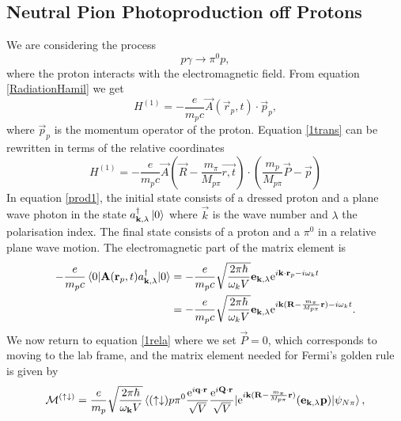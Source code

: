 \subsection{Neutral Pion Photoproduction off Protons}\label{sec:NeutralOffProton}
We are considering the process 
\begin{equation} \label{prod1}
	p\gamma \rightarrow \pi^0 p,
\end{equation}
where the proton interacts with the electromagnetic field. From equation \eqref{RadiationHamil} we get
\begin{equation} \label{1trans}
	H^{(1)} = -\frac{e}{m_pc} \vec{A}(\vec{r}_p,t)\cdot \vec{p}_p,
\end{equation}
where $\vec{p}_p$ is the momentum operator of the proton.  Equation \eqref{1trans} can be rewritten in terms of the relative coordinates
\begin{equation} \label{1rela}
	H^{(1)} = -\frac{e}{m_p c}\vec{A}\left( \vec{R}-\frac{m_\pi}{M_{p\pi}}\vec{r,t}\right) \cdot \left( \frac{m_p}{M_{p\pi}}\vec{P}-\vec{p}\right)
\end{equation}
In equation \eqref{prod1}, the initial state consists of a dressed proton and a plane wave photon in the state $a_{\bm{\mathrm{k}},\lambda}^\dagger\ket{0}$ where $\vec{k}$ is the wave number and $\lambda$ the polarisation index. The final state consists of a proton and a $\pi^0$ in a relative plane wave motion. The electromagnetic part of the matrix element is
\begin{align} \label{eletrans}
	-\frac{e}{m_p c}\mel{0}{\bm{\mathrm{A}}(\bm{\mathrm{r}}_p,t)a^\dagger_{\bm{\mathrm{k}},\lambda}}{0} &= -\frac{e}{m_p c}\sqrt{\frac{2\pi\hbar}{\omega_k V}}\bm{\mathrm{e}}_{\bm{\mathrm{k}},\lambda} \text{e}^{i\bm{\mathrm{k}}\cdot \bm{\mathrm{r}}_p-i\omega_k t} \\
	&=  -\frac{e}{m_p c}\sqrt{\frac{2\pi\hbar}{\omega_k V}}\bm{\mathrm{e}}_{\bm{\mathrm{k}},\lambda} \text{e}^{i\bm{\mathrm{k}}( \bm{\mathrm{R}}-\frac{m_\pi}{M_{p\pi}}\bm{\mathrm{r}})-i\omega_k t}.
\end{align}
We now return to equation \ref{1rela} where we set $\vec{P}=0$, which corresponds to moving to the lab frame, and the matrix element needed for Fermi's golden rule is given by
\begin{equation}\label{MatrixSpinupdown} 
	\mathcal{M}^{(\uparrow\downarrow)} = \frac{e}{m_p} \sqrt{\frac{2\pi\hbar}{\omega_{\bm{\mathrm{k}}}V}} \mel*{(\uparrow\downarrow)p\pi^0 \frac{\text{e}^{i\bm{\mathrm{q}}\cdot \bm{\mathrm{r}}}}{\sqrt{V}}\frac{\text{e}^{i\bm{\mathrm{Q}}\cdot \bm{\mathrm{r}}}}{\sqrt{V}}}{\text{e}^{i\bm{\mathrm{k}}(\bm{\mathrm{R}}-\frac{m_\pi}{M_{p\pi}}\bm{\mathrm{r}})}(\bm{\mathrm{e}}_{\bm{\mathrm{k}},\lambda}\bm{\mathrm{p}})}{\psi_{N\pi}} ,
\end{equation}
